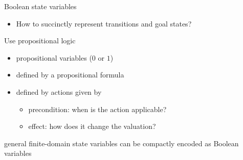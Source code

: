 \documentclass{gkibeamer}
\begin{document}
\begin{frame}{Boolean state variables}
  \begin{itemize}
  \item How to \alert{succinctly} represent \alert{transitions} and
    \alert{goal states}?
  \end{itemize}
  
  \bigskip

   Use \alert{propositional logic}
  \begin{itemize}
  \item {} propositional variables ($0$ or $1$)
  \item {} defined by a propositional formula
  \item {} defined by \alert{actions} given by
    \begin{itemize}
    \item \alert{precondition}: when is the action applicable?
    \item \alert{effect}: how does it change the valuation?
    \end{itemize}
  \end{itemize}

  \bigskip

   general finite-domain state variables can be
  compactly encoded as Boolean variables
\end{frame}
\end{document}
